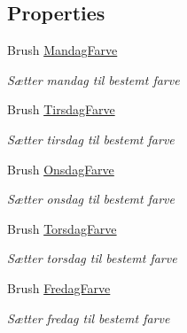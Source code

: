 \subsection*{Properties}
\begin{DoxyCompactItemize}
\item 
Brush \hyperlink{class__1aarsproeve_1_1_view_model_1_1_vagtplan_view_model_ad7b9435c1500a21d04418bedeead2094}{Mandag\+Farve}
\begin{DoxyCompactList}\small\item\em Sætter mandag til bestemt farve \end{DoxyCompactList}\item 
Brush \hyperlink{class__1aarsproeve_1_1_view_model_1_1_vagtplan_view_model_adc98e55c2f01916b7581f1ef865a70bc}{Tirsdag\+Farve}
\begin{DoxyCompactList}\small\item\em Sætter tirsdag til bestemt farve \end{DoxyCompactList}\item 
Brush \hyperlink{class__1aarsproeve_1_1_view_model_1_1_vagtplan_view_model_a3c463aaf64f3e35e910640a29969943d}{Onsdag\+Farve}
\begin{DoxyCompactList}\small\item\em Sætter onsdag til bestemt farve \end{DoxyCompactList}\item 
Brush \hyperlink{class__1aarsproeve_1_1_view_model_1_1_vagtplan_view_model_a88d17bbfb35c27d773321581f4cfd5df}{Torsdag\+Farve}
\begin{DoxyCompactList}\small\item\em Sætter torsdag til bestemt farve \end{DoxyCompactList}\item 
Brush \hyperlink{class__1aarsproeve_1_1_view_model_1_1_vagtplan_view_model_a77eb2c412d3a8adb1a46aad714bae471}{Fredag\+Farve}
\begin{DoxyCompactList}\small\item\em Sætter fredag til bestemt farve \end{DoxyCompactList}\item 

\end{DoxyCompactItemize}
